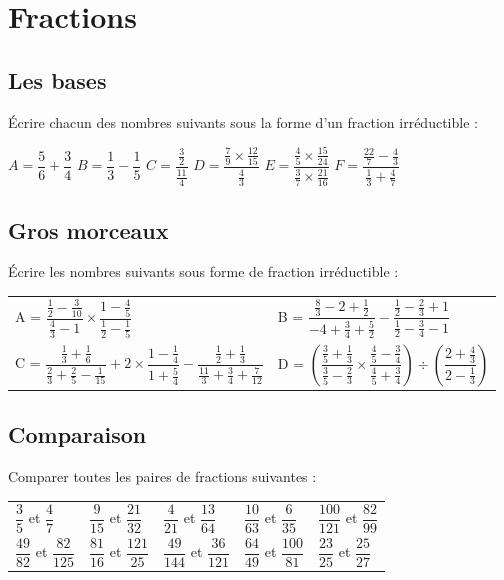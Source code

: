 \documentclass[oneside,12pt]{article}          %
\begin{document}
\section{Fractions}

\subsection{Les bases}
Écrire chacun des nombres suivants sous la forme d'un fraction irréductible :

    $A=\dfrac{5}{6}+\dfrac{3}{4}$ \qquad \quad
    $B=\dfrac{1}{3}-\dfrac{1}{5}$ \qquad\quad
    $C=\dfrac{\frac{3}{2}}{\frac{11}{4}}$ \qquad\quad
    $D=\dfrac{\frac{7}{9}\times\frac{12}{15}}{\frac{4}{3}}$ \qquad\quad
    $E=\dfrac{\frac{4}{5}\times\frac{15}{24}}{\frac{3}{7}\times\frac{21}{16}}$ \qquad \quad
    $F=\dfrac{\frac{22}{7}-\frac{4}{3}}{\frac{1}{3}+\frac{4}{7}}$



\subsection{Gros morceaux}
Écrire les nombres suivants sous forme de fraction irréductible :

\renewcommand{\arraystretch}{3.1}
\begin{tabular}{p{} p{}}
    A = $\dfrac{\frac{1}{2}-\frac{3}{10}}{\frac{4}{3}-1}\times\dfrac{1-\frac{4}{5}}{\frac{1}{2}-\frac{1}{5}}$ & B = $\dfrac{\frac{8}{3}-2+\frac{1}{2}}{-4+\frac{3}{4}+\frac{5}{2}}-\dfrac{\frac{1}{2}-\frac{2}{3}+1}{\frac{1}{2}-\frac{3}{4}-1}$ \\
    C = $\dfrac{\frac{1}{3}+\frac{1}{6}}{\frac{2}{3}+\frac{2}{5}-\frac{1}{15}}+2\times\dfrac{1-\frac{1}{4}}{1+\frac{5}{4}}-\dfrac{\frac{1}{2}+\frac{1}{3}}{\frac{11}{3}+\frac{3}{4}+\frac{7}{12}}$ &  D = $\left(\dfrac{\frac{3}{5}+\frac{1}{3}}{\frac{3}{5}-\frac{2}{3}}\times\dfrac{\frac{4}{5}-\frac{3}{4}}{\frac{4}{5}+\frac{3}{4}}\right)\div\left(\dfrac{2+\frac{4}{3}}{2-\frac{1}{3}}\right)$
\end{tabular}



\subsection{Comparaison}
Comparer toutes les paires de fractions suivantes :

\begin{tabular}{P{0.17\textwidth} P{0.17\textwidth} P{0.17\textwidth} P{0.17\textwidth} P{0.17\textwidth}}
	$\dfrac{3}{5}$ et $\dfrac{4}{7}$ & $\dfrac{9}{15}$ et $\dfrac{21}{32}$ & $\dfrac{4}{21}$ et $\dfrac{13}{64}$ &	$\dfrac{10}{63}$ et $\dfrac{6}{35}$ & $\dfrac{100}{121}$ et $\dfrac{82}{99}$ \\	
	$\dfrac{49}{82}$ et $\dfrac{82}{125}$ & $\dfrac{81}{16}$ et $\dfrac{121}{25}$ & $\dfrac{49}{144}$ et $\dfrac{36}{121}$ & $\dfrac{64}{49}$ et $\dfrac{100}{81}$ & $\dfrac{23}{25}$ et $\dfrac{25}{27}$
\end{tabular}
\end{document}
